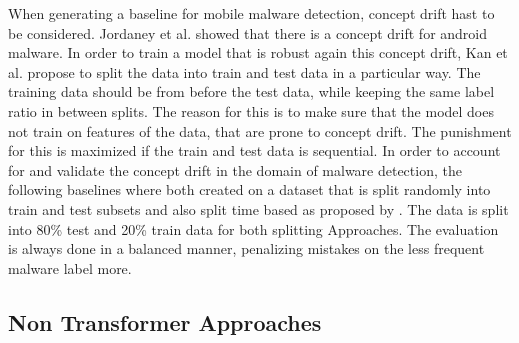 When generating a baseline for mobile malware detection, concept drift hast to be considered.
Jordaney et al. \cite{transcend} showed that there is a concept drift for android malware.
In order to train a model that is robust again this concept drift, 
Kan et al. \cite{tesseract} propose to split the data into train and test data in a particular way.
The training data should be from before the test data, 
while keeping the same label ratio in between splits.  
The reason for this is to make sure that the model does not train on features of the data, 
that are prone to concept drift.
The punishment for this is maximized if the train and test data is sequential.
In order to account for and validate the concept drift in the domain of malware detection,
the following baselines where both created on a dataset that is split randomly into train and test subsets
and also split time based as proposed by \cite{transcend}.
The data is split into 80\% test and 20\% train data for both splitting Approaches.
The evaluation is always done in a balanced manner, penalizing mistakes on the less frequent malware label more.

\subsection{Non Transformer Approaches}

